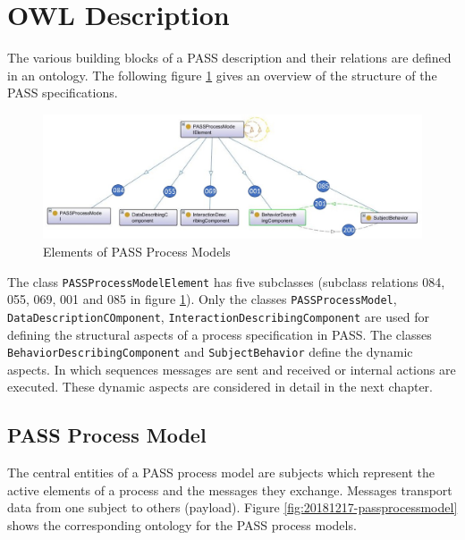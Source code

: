 \section{OWL Description}
\label{OWL-DescriptionSID}

The various building blocks of a PASS description and their relations are defined in an ontology. The following figure \ref{fig:20171217-passprocessmodellelement} gives an overview of the structure of the PASS specifications.   

\begin{figure}[htbp]
	\centering
	\includegraphics[width=0.9\linewidth]{Figures/Ontology/SubjectInteraction/20171217-PASSProcessModellElement}
	\caption[Elements of PASS Process Models]{Elements of PASS Process Models}
	\label{fig:20171217-passprocessmodellelement}
\end{figure}

The class \texttt{PASSProcessModelElement} has five subclasses (subclass relations 084, 055, 069, 001 and 085 in figure \ref{fig:20171217-passprocessmodellelement}). Only the classes \texttt{PASSProcessModel}, \texttt{DataDescriptionCOmponent}, \texttt{InteractionDescribingComponent} are used for defining the structural aspects of a process specification in PASS. The classes \texttt{BehaviorDescribingComponent} and \texttt{SubjectBehavior} define the dynamic aspects. In which sequences messages are sent and received or internal actions are executed. These dynamic aspects are considered in detail in the next chapter. 

\subsection{PASS Process Model}

The central entities of a PASS process model are subjects which represent the active elements of a process and the messages they exchange. Messages transport data from one subject to others (payload). Figure \ref{fig:20181217-passprocessmodel} shows the corresponding ontology for the PASS process models.

